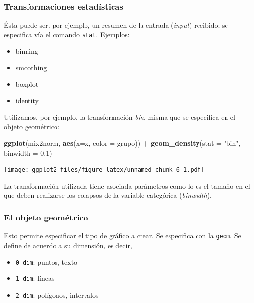 \documentclass[]{article}
\newenvironment{Shaded}{\begin{snugshade}}{\end{snugshade}}
\newcommand{\KeywordTok}[1]{\textcolor[rgb]{0.13,0.29,0.53}{\textbf{#1}}}
\newcommand{\DataTypeTok}[1]{\textcolor[rgb]{0.13,0.29,0.53}{#1}}
\newcommand{\FloatTok}[1]{\textcolor[rgb]{0.00,0.00,0.81}{#1}}
\newcommand{\StringTok}[1]{\textcolor[rgb]{0.31,0.60,0.02}{#1}}
\newcommand{\OperatorTok}[1]{\textcolor[rgb]{0.81,0.36,0.00}{\textbf{#1}}}
\newcommand{\NormalTok}[1]{#1}
\providecommand{\tightlist}{%
  \setlength{\itemsep}{0pt}\setlength{\parskip}{0pt}}
\begin{document}
\subsubsection{Transformaciones
estadísticas}\label{transformaciones-estadisticas}

Ésta puede ser, por ejemplo, un resumen de la entrada (\emph{input})
recibido; se especifica vía el comando \texttt{stat}. Ejemplos:

\begin{itemize}
\tightlist
\item
  binning
\item
  smoothing
\item
  boxplot
\item
  identity
\end{itemize}

Utilizamos, por ejemplo, la transformación \emph{bin}, misma que se
especifica en el objeto geométrico:

\begin{Shaded}
\begin{Highlighting}[]
\KeywordTok{ggplot}\NormalTok{(mix2norm, }\KeywordTok{aes}\NormalTok{(}\DataTypeTok{x=}\NormalTok{x, }\DataTypeTok{color =}\NormalTok{ grupo)) }\OperatorTok{+}\StringTok{ }
\StringTok{  }\KeywordTok{geom_density}\NormalTok{(}\DataTypeTok{stat =} \StringTok{"bin"}\NormalTok{, }\DataTypeTok{binwidth =} \FloatTok{0.1}\NormalTok{)}
\end{Highlighting}
\end{Shaded}

\texttt{[image: ggplot2\_files/figure-latex/unnamed-chunk-6-1.pdf]}

La transformación utilizada tiene asociada parámetros como lo es el
tamaño en el que deben realizarse los colapsos de la variable categórica
(\emph{binwidth}).

\subsubsection{El objeto geométrico}\label{el-objeto-geometrico}

Esto permite especificar el tipo de gráfico a crear. Se especifica con
la \texttt{geom}. Se define de acuerdo a su dimensión, es decir,

\begin{itemize}
\tightlist
\item
  \texttt{0-dim}: puntos, texto
\item
  \texttt{1-dim}: líneas
\item
  \texttt{2-dim}: polígonos, intervalos
\end{itemize}
\end{document}
